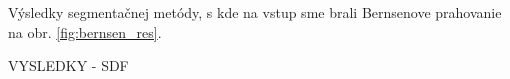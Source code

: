 \documentclass[a4paper,11pt,oneside]{article}%
\begin{document}
Výsledky segmentačnej metódy, s kde na vstup sme brali Bernsenove prahovanie na obr. \ref{fig:bernsen_res}.

VYSLEDKY - SDF

\begin{figure}[H]  
    \hspace{5px}

\end{figure}
\end{document}
